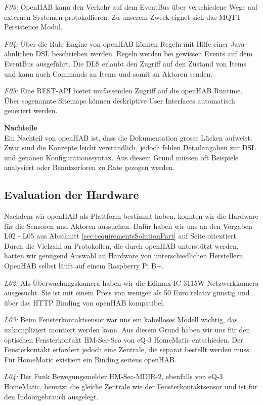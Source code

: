 \textit{F03:} OpenHAB kann den Verkehr auf dem EventBus über verschiedene Wege auf externen Systemen protokollieren. Zu unserem Zweck eignet sich das MQTT Persistence Modul.

\textit{F04:} Über die Rule Engine von openHAB können Regeln mit Hilfe einer Java-ähnlichen DSL beschrieben werden. Regeln werden bei gewissen Events auf dem EventBus ausgeführt. Die DLS erlaubt den Zugriff auf den Zustand von Items und kann auch Commands an Items und somit an Aktoren senden.

\textit{F05:} Eine REST-API bietet umfassenden Zugriff auf die openHAB Runtime. Über sogenannte Sitemaps können deskriptive User Interfaces automatisch generiert werden.



\textbf{Nachteile} \\
Ein Nachteil von openHAB ist, dass die Dokumentation grosse Lücken aufweist. Zwar sind die Konzepte leicht verständlich, jedoch fehlen Detailangaben zur DSL und genauen Konfigurationssyntax. Aus diesem Grund müssen oft Beispiele analysiert oder Benutzerforen zu Rate gezogen werden.

\subsection{Evaluation der Hardware}
Nachdem wir openHAB als Plattform bestimmt haben, konnten wir die Hardware für die Sensoren und Aktoren aussuchen. Dafür haben wir uns an den Vorgaben L02 - L05 aus Abschnitt \ref{sec:requirementsSolutionPart} auf Seite \pageref{sec:requirementsSolutionPart} orientiert. Durch die Vielzahl an Protokollen, die durch openHAB unterstützt werden, hatten wir genügend Auswahl an Hardware von unterschiedlichen Herstellern. OpenHAB selbst läuft auf einem Raspberry Pi B+.

\textit{L02:} Als Überwachungskamera haben wir die Edimax IC-3115W Netzwerkkamera ausgesucht. Sie ist mit einem Preis von weniger als 50 Euro relativ günstig und über das HTTP Binding von openHAB kompatibel.

\textit{L03:} Beim Fensterkontaktsensor war uns ein kabelloses Modell wichtig, das unkompliziert montiert werden kann. Aus diesem Grund haben wir uns für den optischen Fensterkontakt HM-Sec-Sco von eQ-3 HomeMatic entschieden. Der Fensterkontakt erfordert jedoch eine Zentrale, die separat bestellt werden muss. Für HomeMatic existiert ein Binding seitens openHAB.

\textit{L04:} Der Funk Bewegungsmelder HM-Sec-MDIR-2, ebenfalls von eQ-3 HomeMatic, benutzt die gleiche Zentrale wie der Fensterkontaktsensor und ist für den Indoorgebrauch ausgelegt.

